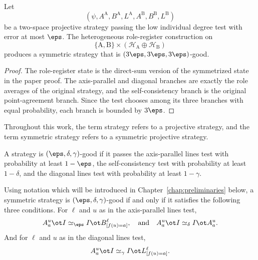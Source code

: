 \begin{lemma}\label{lem:heterogeneous-role-register-symmetrization}
	\leanok
	Let
	\[
		(\psi,A^{\mathrm A},B^{\mathrm A},L^{\mathrm A},
		A^{\mathrm B},B^{\mathrm B},L^{\mathrm B})
	\]
	be a two-space projective strategy passing the low individual degree test
	with error at most \(\eps\).  The heterogeneous role-register construction
	on
	\[
		\{\mathrm A,\mathrm B\}\times
		(\mathcal H_{\mathrm A}\oplus\mathcal H_{\mathrm B})
	\]
	produces a symmetric strategy that is
	\((3\eps,3\eps,3\eps)\)-good.
\end{lemma}
\begin{proof}
	\leanok
	The role-register state is the direct-sum version of the symmetrized state in
	the paper proof.  The axis-parallel and diagonal branches are exactly the
	role averages of the original strategy, and the self-consistency branch is
	the original point-agreement branch.  Since the test chooses among its three
	branches with equal probability, each branch is bounded by \(3\eps\).
\end{proof}

\begin{remark}\label{rem:strategy-convention}
	Throughout this work, the term strategy refers to a projective strategy, and the term symmetric strategy refers to a symmetric projective strategy.
\end{remark}

\begin{definition}\label{def:good-strategy}
	\leanok
	A strategy is $(\eps,\delta,\gamma)$-good if it passes the axis-parallel lines test with probability at least $1-\eps$, the self-consistency test with probability at least $1-\delta$, and the diagonal lines test with probability at least $1-\gamma$.
\end{definition}

\begin{remark}\label{rem:good-strat-characterization}
	Using notation which will be introduced in Chapter~\ref{chap:preliminaries} below, a symmetric strategy is $(\eps,\delta,\gamma)$-good if and only if it satisfies the following three conditions. For $\ell$ and $u$ as in the axis-parallel lines test,
	\[
		A_a^u \ot I \simeq_\eps I \ot B^\ell_{[f(u)=a]},
		\quad
		\text{and}
		\quad
		A_a^u \ot I \simeq_\delta I \ot A_a^u.
	\]
	And for $\ell$ and $u$ as in the diagonal lines test,
	\[
		A_a^u \ot I \simeq_\gamma I \ot L^\ell_{[f(u)=a]}.
	\]
\end{remark}


